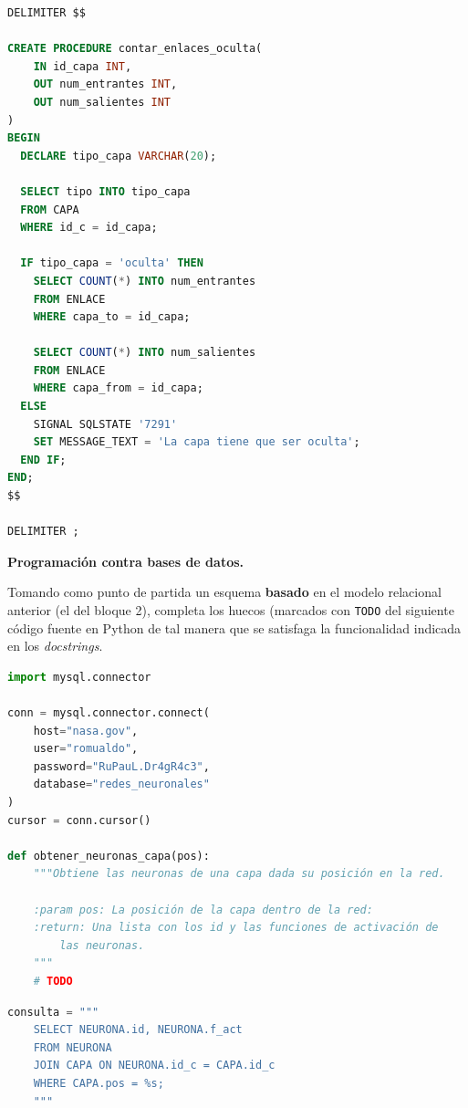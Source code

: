 \documentclass[
    12pt,
    a4paper,
    addpoints,
    answers,
    convocatoria=ord,
    titulacion=CD,
    curso=2024/2025,
]{db-exam}
\begin{document}
\begin{questions}
\begin{parts}
\begin{solution}

\begin{lstlisting}[language=sql]
DELIMITER $$

CREATE PROCEDURE contar_enlaces_oculta(
    IN id_capa INT,
    OUT num_entrantes INT,
    OUT num_salientes INT
)
BEGIN
  DECLARE tipo_capa VARCHAR(20);

  SELECT tipo INTO tipo_capa
  FROM CAPA
  WHERE id_c = id_capa;

  IF tipo_capa = 'oculta' THEN
    SELECT COUNT(*) INTO num_entrantes
    FROM ENLACE
    WHERE capa_to = id_capa;

    SELECT COUNT(*) INTO num_salientes
    FROM ENLACE
    WHERE capa_from = id_capa;
  ELSE
    SIGNAL SQLSTATE '7291'
    SET MESSAGE_TEXT = 'La capa tiene que ser oculta';
  END IF;
END;
$$

DELIMITER ;
\end{lstlisting}

\end{solution}

\end{parts}

\question[2] \textbf{Programación contra bases de datos.}

Tomando como punto de partida un esquema \textbf{basado} en el modelo relacional anterior (el del bloque 2), completa los huecos (marcados con \texttt{TODO} del siguiente código fuente en Python de tal manera que se satisfaga la funcionalidad indicada en los \textit{docstrings}.

\begin{lstlisting}[language=Python]
import mysql.connector

conn = mysql.connector.connect(
    host="nasa.gov",
    user="romualdo",
    password="RuPauL.Dr4gR4c3",
    database="redes_neuronales"
)
cursor = conn.cursor()

def obtener_neuronas_capa(pos):
    """Obtiene las neuronas de una capa dada su posición en la red.

    :param pos: La posición de la capa dentro de la red:
    :return: Una lista con los id y las funciones de activación de
        las neuronas.
    """
    # TODO
\end{lstlisting}

\begin{solutionorbox}
\begin{lstlisting}[language=Python]
    consulta = """
    SELECT NEURONA.id, NEURONA.f_act
    FROM NEURONA
    JOIN CAPA ON NEURONA.id_c = CAPA.id_c
    WHERE CAPA.pos = %s;
    """
\end{lstlisting}
\end{solutionorbox}


\end{questions}
\end{document}
